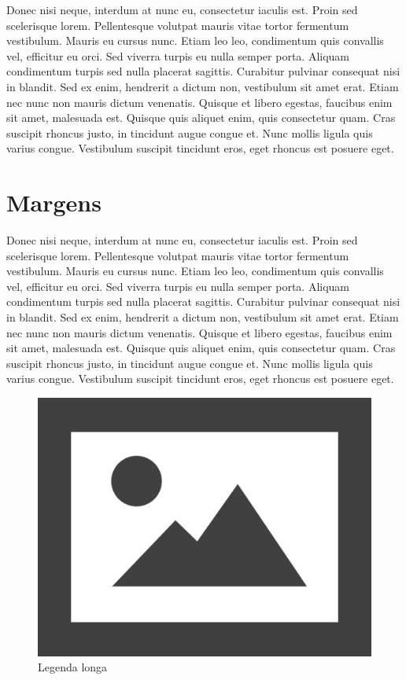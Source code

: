 \documentclass[12pt]{article}
\begin{document}
\begin{spacing}{3} %

Donec nisi neque, interdum at nunc eu, consectetur iaculis est. Proin sed scelerisque lorem. Pellentesque volutpat mauris vitae tortor fermentum vestibulum. Mauris eu cursus nunc. Etiam leo leo, condimentum quis convallis vel, efficitur eu orci. Sed viverra turpis eu nulla semper porta. Aliquam condimentum turpis sed nulla placerat sagittis. Curabitur pulvinar consequat nisi in blandit. Sed ex enim, hendrerit a dictum non, vestibulum sit amet erat. Etiam nec nunc non mauris dictum venenatis. Quisque et libero egestas, faucibus enim sit amet, malesuada est. Quisque quis aliquet enim, quis consectetur quam. Cras suscipit rhoncus justo, in tincidunt augue congue et. Nunc mollis ligula quis varius congue. Vestibulum suscipit tincidunt eros, eget rhoncus est posuere eget.

\end{spacing}

\section{Margens}

Donec nisi neque, interdum at nunc eu, consectetur iaculis est. Proin sed scelerisque lorem. Pellentesque volutpat mauris vitae tortor fermentum vestibulum. Mauris eu cursus nunc. Etiam leo leo, condimentum quis convallis vel, efficitur eu orci. Sed viverra turpis eu nulla semper porta. Aliquam condimentum turpis sed nulla placerat sagittis. Curabitur pulvinar consequat nisi in blandit. Sed ex enim, hendrerit a dictum non, vestibulum sit amet erat. Etiam nec nunc non mauris dictum venenatis. Quisque et libero egestas, faucibus enim sit amet, malesuada est. Quisque quis aliquet enim, quis consectetur quam. Cras suscipit rhoncus justo, in tincidunt augue congue et. Nunc mollis ligula quis varius congue. Vestibulum suscipit tincidunt eros, eget rhoncus est posuere eget.

\begin{figure}[H]
	\centering
	\includegraphics[width=0.7\linewidth]{Figuras/fig1}
	\caption[Legenda curta]{Legenda longa}
	\label{fig:figura genérica}
\end{figure}
\end{document}
